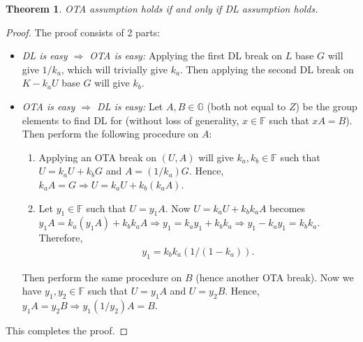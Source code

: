 \documentclass{article}
\newtheorem{theorem}{Theorem}[section]
\begin{document}
\begin{theorem}
OTA assumption holds if and only if DL assumption holds.
\end{theorem}
\begin{proof}
The proof consists of 2 parts:
\begin{itemize}
    \item \textit{DL is easy $\Rightarrow$ OTA is easy:} Applying the first DL break on $L$ base $G$ will give $1/k_a$, which will trivially give $k_a$. Then applying the second DL break on $K - k_a U$ base $G$ will give $k_b$.
    \item \textit{OTA is easy $\Rightarrow$ DL is easy:} Let $A, B\in\mathbb{G}$ (both not equal to $Z$) be the group elements to find DL for (without loss of generality, $x\in\mathbb{F}$ such that $xA=B$). Then perform the following procedure on $A$:
        \begin{enumerate}
        \item Applying an OTA break on $(U, A)$ will give $k_a, k_b\in\mathbb{F}$ such that $U = k_a U + k_b G$ and $A = (1/k_a)G$. Hence, $k_a A = G \Rightarrow U = k_a U + k_b (k_a A)$.
        \item Let $y_1\in\mathbb{F}$ such that $U=y_1 A$. Now $U = k_a U + k_b k_a A$ becomes $y_1 A = k_a (y_1 A) + k_b k_a A \Rightarrow y_1 = k_a y_1 + k_b k_a \Rightarrow y_1 - k_a y_1 = k_b k_a$. Therefore,
        \begin{align*}
            y_1 = k_b k_a (1/(1 - k_a)).
        \end{align*}
        \end{enumerate}
Then perform the same procedure on $B$ (hence another OTA break). Now we have $y_1, y_2\in\mathbb{F}$ such that $U=y_1 A$ and $U=y_2 B$. Hence, $y_1 A = y_2 B \Rightarrow  y_1(1/y_2) A = B$.
\end{itemize}
This completes the proof.
\end{proof}
\end{document}

